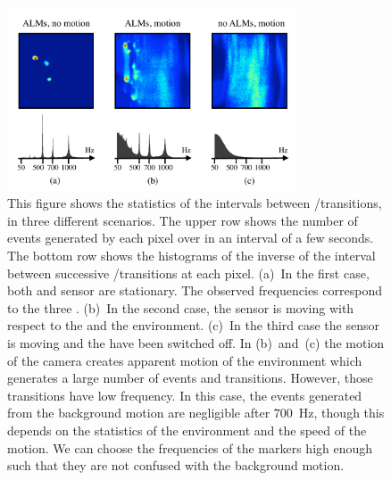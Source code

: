 \vfill

\begin{figure}[H]
\centering{}\includegraphics[bb=15bp 5bp 483bp 300bp,clip,width=8.6cm]{figures/slides/motion_small}\caption{\label{fig:switch-hist}This figure shows the statistics of the intervals
between \pP/\pN transitions, in three different scenarios. The upper
row shows the number of events generated by each pixel over in an
interval of a few seconds. The bottom row shows the histograms of
the inverse of the interval between successive \pP/\pN transitions
at each pixel. (a)~In the first case, both \ALMs and sensor are
stationary. The observed frequencies correspond to the three \ALMs.
(b)~In the second case, the sensor is moving with respect to the
\ALMs and the environment. (c)~In the third case the sensor is moving
and the \ALMs have been switched off. In (b)~and~(c) the motion
of the camera creates apparent motion of the environment which generates
a large number of events and transitions. However, those transitions
have low frequency. In this case, the events generated from the background
motion are negligible after $700$~Hz, though this depends on the
statistics of the environment and the speed of the motion. We can
choose the frequencies of the markers high enough such that they are
not confused with the background motion.}
\end{figure}

